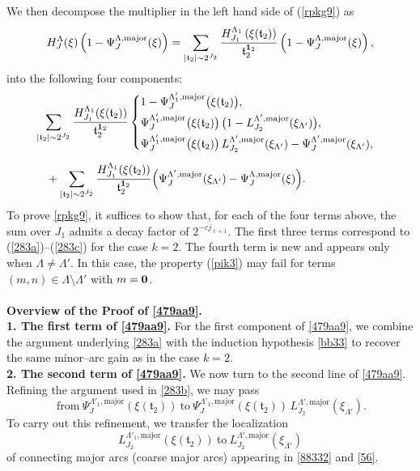 \documentclass[10pt,a4paper]{amsart}
\numberwithin{equation}{section}
\begin{document}
We then decompose the multiplier in the left hand side of (\ref{rpkg9}) as
\[  H^{\Lambda}_J(\xi) \left( 1 - \Psi^{\Lambda,\mathrm{major}}_{J}(\xi) \right)=
\sum_{|\mathfrak{t}_2|\sim 2^{J_2}} 
\frac{ H^{\Lambda_{1}}_{J_1}\left( \xi(\mathfrak{t}_2) \right)}{\mathfrak{t}_{2}^{{\bf 1}_2}} \left( 1 - \Psi^{\Lambda,\mathrm{major}}_{J}(\xi) \right),
\]
into the following four components:
\begin{align}\label{479aa9}
&\sum_{|\mathfrak{t}_2|\sim 2^{J_2}}
\frac{ H^{\Lambda_{1}}_{J_1}\!\left( \xi(\mathfrak{t}_2) \right)}{\mathfrak{t}_{2}^{{\bf 1}_2}}
\begin{cases}
1 - \Psi^{\Lambda'_{1},\mathrm{major}}_{J}\bigl(\xi(\mathfrak{t}_2)\bigr), \\[3pt]
\Psi^{\Lambda'_{1},\mathrm{major}}_{J}\bigl(\xi(\mathfrak{t}_2)\bigr)\,
\bigl( 1 - L^{\Lambda',\mathrm{major}}_{J_2}(\xi_{\Lambda'}) \bigr), \\[3pt]
\Psi^{\Lambda'_{1},\mathrm{major}}_{J}\bigl(\xi(\mathfrak{t}_2)\bigr)\,
L^{\Lambda',\mathrm{major}}_{J_2}(\xi_{\Lambda'})
- \Psi^{\Lambda',\mathrm{major}}_{J}(\xi_{\Lambda'}),
\end{cases} \\[5pt]
&\quad +
\sum_{|\mathfrak{t}_2|\sim 2^{J_2}}
\frac{ H^{\Lambda_{1}}_{J_1}\!\left( \xi(\mathfrak{t}_2) \right)}{\mathfrak{t}_{2}^{{\bf 1}_2}}
\Bigl(
\Psi^{\Lambda',\mathrm{major}}_{J}(\xi_{\Lambda'})
- \Psi^{\Lambda,\mathrm{major}}_{J}(\xi)
\Bigr). \nonumber
\end{align}
To prove \eqref{rpkg9}, it suffices to show that, for each of the four terms above, the sum over $J_1$ admits a decay factor of $2^{-c j_{\ell+1}}$.
The first three terms correspond  to (\ref{283a})--(\ref{283c}) for the case $k=2$. The fourth term is new and appears only when $\Lambda\ne \Lambda'$. In this case, the property (\ref{pik3}) may fail for terms $(m,n)\in\Lambda\setminus\Lambda'$ with $m={\bf 0}$.
\\
\\
\textbf{Overview of the Proof of \eqref{479aa9}.}\\
\noindent\textbf{1. The first term of \eqref{479aa9}.}
For the first component of \eqref{479aa9}, we combine the argument underlying 
\eqref{283a} with the induction hypothesis \eqref{bb33} to recover the same minor–arc gain as in the case $k=2$. \\
\noindent\textbf{2. The second term of \eqref{479aa9}.}
We now turn to the second line of \eqref{479aa9}.
Refining the argument used in \eqref{283b},  we may pass
\[\ \text{from}\ 
\Psi_{J}^{\Lambda'_1,\mathrm{major}}\!\left(\xi(\mathfrak{t}_2)\right)
\ \text{to}\ 
\Psi_{J}^{\Lambda'_1,\mathrm{major}}\!\left(\xi(\mathfrak{t}_2)\right)
\,L^{\Lambda',\mathrm{major}}_{J_2}(\xi_{\Lambda'}).
\]
To carry out this refinement, we transfer the localization
\[
L_{J_2}^{\Lambda'_1,\mathrm{major}}\!\left(\xi(\mathfrak{t}_2)\right)
\ \text{to}\ 
L_{J_2}^{\Lambda',\mathrm{major}}(\xi_{\Lambda'})
\]
of connecting major arcs (coarse major arcs) appearing in  \eqref{88332} and \eqref{56}.
\end{document}
